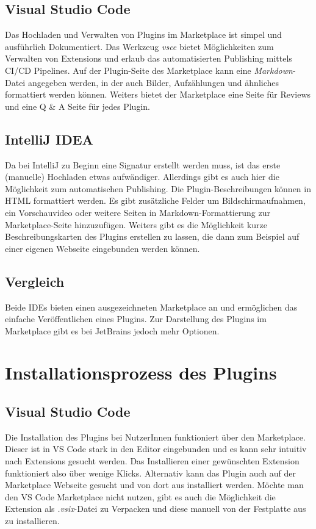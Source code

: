 \subsection{Visual Studio Code}

Das Hochladen und Verwalten von Plugins im Marketplace ist
simpel und ausführlich Dokumentiert. Das Werkzeug \emph{vsce}
bietet Möglichkeiten zum Verwalten von Extensions und 
erlaub das automatisierten Publishing mittels CI/CD Pipelines.
Auf der Plugin-Seite des Marketplace kann eine \emph{Markdown}-Datei
angegeben werden, in der auch Bilder, Aufzählungen und ähnliches formattiert
werden können. Weiters bietet der Marketplace eine Seite für Reviews
und eine Q \& A Seite für jedes Plugin.

\subsection{IntelliJ IDEA}

Da bei IntelliJ zu Beginn eine Signatur erstellt werden muss, ist das
erste (manuelle) Hochladen etwas aufwändiger. Allerdings
gibt es auch hier die Möglichkeit zum automatischen Publishing.
Die Plugin-Beschreibungen können in HTML formattiert werden. Es gibt
zusätzliche Felder um Bildschirmaufnahmen, ein Vorschauvideo oder
weitere Seiten in Markdown-Formattierung zur Marketplace-Seite
hinzuzufügen. Weiters gibt es die Möglichkeit kurze Beschreibungskarten
des Plugins erstellen zu lassen, die dann zum Beispiel auf 
einer eigenen Webseite eingebunden werden können.

\subsection{Vergleich}

Beide IDEs bieten einen ausgezeichneten Marketplace an
und ermöglichen das einfache Veröffentlichen eines Plugins.
Zur Darstellung des Plugins im Marketplace gibt es bei JetBrains
jedoch mehr Optionen.


\section{Installationsprozess des Plugins}
\label{sec:Vergleich_Installationsprozess}

\subsection{Visual Studio Code}

Die Installation des Plugins bei NutzerInnen funktioniert
über den Marketplace. Dieser ist in VS Code stark in den 
Editor eingebunden und es kann sehr intuitiv nach 
Extensions gesucht werden. Das Installieren einer gewünschten
Extension funktioniert also über wenige Klicks.
Alternativ kann das Plugin auch auf der Marketplace Webseite
gesucht und von dort aus installiert werden.
Möchte man den VS Code Marketplace nicht nutzen, gibt es auch
die Möglichkeit die Extension als \emph{.vsix}-Datei
zu Verpacken und diese manuell von der Festplatte aus zu installieren.


